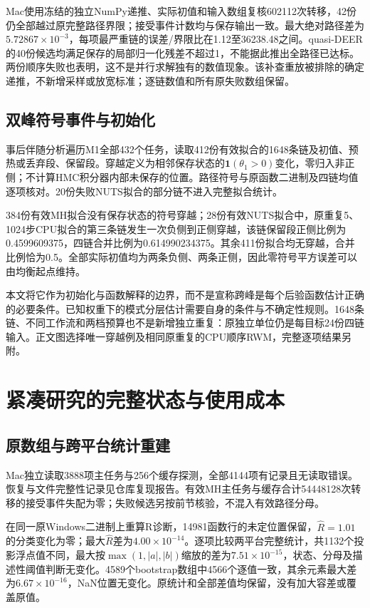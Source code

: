 \documentclass[UTF8,fontset=fandol,zihao=-4]{ctexart}
\begin{document}
Mac使用冻结的独立NumPy递推、实际初值和输入数组复核602112次转移，42份仍全部越过原完整路径界限；接受事件计数均与保存输出一致。最大绝对路径差为$5.72867\times10^{-3}$，每项最严重链的误差/界限比在1.12至36238.48之间。quasi-DEER的40份候选均满足保存的局部归一化残差不超过1，不能据此推出全路径已达标。两份顺序失败也表明，这不是并行求解独有的数值现象。该补查重放被排除的确定递推，不新增采样或放宽标准；逐链数值和所有原失败数组保留。



\subsection{双峰符号事件与初始化}
事后伴随分析遍历M1全部432个任务，读取412份有效拟合的1648条链及初值、预热或丢弃段、保留段。穿越定义为相邻保存状态的$\mathbf1(\theta_1>0)$变化，零归入非正侧；不计算HMC积分器内部未保存的位置。路径符号与原函数二进制及四链均值逐项核对。20份失败NUTS拟合的部分链不进入完整拟合统计。

384份有效MH拟合没有保存状态的符号穿越；28份有效NUTS拟合中，原重复5、1024步CPU拟合的第三条链发生一次负侧到正侧穿越，该链保留段正侧比例为0.4599609375，四链合并比例为0.614990234375。其余411份拟合均无穿越，合并比例恰为0.5。全部实际初值均为两条负侧、两条正侧，因此零符号平方误差可以由均衡起点维持。

本文将它作为初始化与函数解释的边界，而不是宣称跨峰是每个后验函数估计正确的必要条件。已知权重下的模式分层估计需要自身的条件与不确定性规则。1648条链、不同工作流和两档预算也不是新增独立重复：原独立单位仍是每目标24份四链输入。正文图选择唯一穿越例及相同原重复的CPU顺序RWM，完整逐项结果另附。

\section{紧凑研究的完整状态与使用成本}


\subsection{原数组与跨平台统计重建}
Mac独立读取3888项主任务与256个缓存探测，全部4144项有记录且无读取错误。恢复与文件完整性记录见仓库复现报告。有效MH主任务与缓存合计54448128次转移的接受事件失配为零；失败候选另按前节核验，不混入有效路径分母。

在同一原Windows二进制上重算R诊断，14981函数行的未定位置保留，$\hat R=1.01$的分类变化为零；最大$\hat R$差为$4.00\times10^{-14}$。逐项比较两平台完整统计，共1132个投影浮点值不同，最大按$\max(1,|a|,|b|)$缩放的差为$7.51\times10^{-15}$，状态、分母及描述性阈值判断无变化。4589个bootstrap数组中4566个逐值一致，其余元素最大差为$6.67\times10^{-16}$，NaN位置无变化。原统计和全部差值均保留，没有加大容差或覆盖原值。
\end{document}
